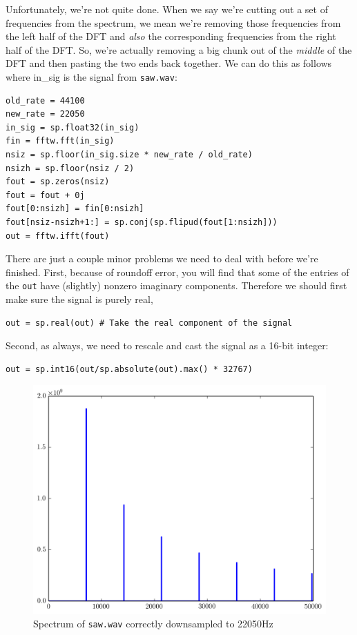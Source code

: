 Unfortunately, we're not quite done. When we say we're cutting out a set of frequencies from the spectrum, we mean we're removing those frequencies from the left half of the DFT and \emph{also} the corresponding frequencies from the right half of the DFT. So, we're actually removing a big chunk out of the \emph{middle} of the DFT and then pasting the two ends back together. We can do this as follows where in\_sig is the signal from \texttt{saw.wav}:
\begin{lstlisting}
old_rate = 44100
new_rate = 22050
in_sig = sp.float32(in_sig)
fin = fftw.fft(in_sig)
nsiz = sp.floor(in_sig.size * new_rate / old_rate)
nsizh = sp.floor(nsiz / 2)
fout = sp.zeros(nsiz)
fout = fout + 0j
fout[0:nsizh] = fin[0:nsizh]
fout[nsiz-nsizh+1:] = sp.conj(sp.flipud(fout[1:nsizh]))
out = fftw.ifft(fout)
\end{lstlisting}
There are just a couple minor problems we need to deal with before we're finished.
First, because of roundoff error, you will find that some of the entries of the \texttt{out} have (slightly) nonzero imaginary components. Therefore we should first make sure the signal is purely real,
\begin{lstlisting}
out = sp.real(out) # Take the real component of the signal
\end{lstlisting}
Second, as always, we need to rescale and cast the signal as a 16-bit integer:
\begin{lstlisting}
out = sp.int16(out/sp.absolute(out).max() * 32767)
\end{lstlisting}

\begin{figure}[ht]\caption{Spectrum of \texttt{saw.wav} correctly downsampled to 22050Hz}\label{sawspecdown2}\centering\includegraphics[width=\textwidth]{sawdownspec}\end{figure}

